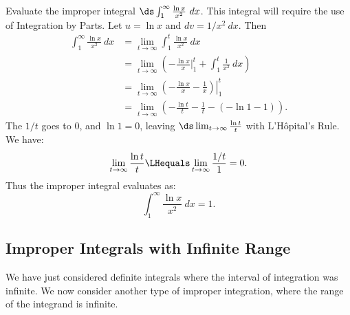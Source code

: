 \begin{example}\label{ex_impint2}
Evaluate the improper integral $\ds \int_1^\infty \frac{\ln x}{x^2}\ dx$.
\solution
This integral will require the use of Integration by Parts. Let $u = \ln x$ and $dv = 1/x^2\ dx$. Then
%
%
\begin{align*}
	\int_1^\infty\frac{\ln x}{x^2}\ dx
	&= \lim_{t\to\infty}\int_1^t\frac{\ln x}{x^2}\ dx \\
	&=  \lim_{t\to\infty}\left(-\frac{\ln x}{x}\Big|_1^t +\int_1^t \frac{1}{x^2} \ dx \right)\\
	&=  \lim_{t\to\infty} \left.\left(-\frac{\ln x}{x} -\frac1x\right)\right|_1^t\\
	&=	\lim_{t\to\infty} \left(-\frac{\ln t}{t}-\frac1t - \left(-\ln 1-1\right)\right).
\end{align*}
The $1/t$ goes to 0, and $\ln 1=0$, leaving
$\ds \lim_{t\to\infty} \frac{\ln t}{t}$ with L'H\^opital's Rule. We have:
\[\lim_{t\to\infty}\frac{\ln t}t \LHequals \lim_{t\to\infty} \frac{1/t}{1} = 0.\]
Thus the improper integral evaluates as:
\[\int_1^\infty\frac{\ln x}{x^2}\ dx = 1.\]
\end{example}

\subsection{Improper Integrals with Infinite Range}

We have just considered definite integrals where the interval of integration was infinite. We now consider another type of improper integration, where the range of the integrand is infinite.


